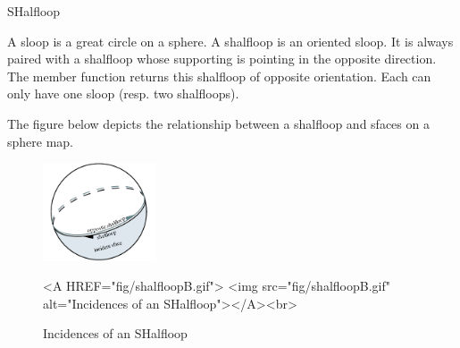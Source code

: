 
\ccRefPageBegin



\begin{ccRefClass}{SHalfloop}

\ccDefinition

A sloop is a great circle on a sphere. A shalfloop is an oriented sloop. It is always paired with a 
shalfloop whose supporting  is pointing in
the opposite direction. The  member function returns
this shalfloop of opposite orientation. Each  can only have one sloop 
(resp. two shalfloops).

The figure below
depicts the relationship between a shalfloop and sfaces on a sphere map.  


\begin{figure}[bht]
\begin{center}
\begin{ccTexOnly}
          \parbox{0.3\textwidth}{%
              \includegraphics[width=0.3\textwidth]{Nef_S2_ref/fig/shalfloopB}%
          }
\end{ccTexOnly}
\begin{ccHtmlOnly}
    <A HREF="fig/shalfloopB.gif">
        <img src="fig/shalfloopB.gif" 
             alt="Incidences of an SHalfloop"></A><br>
\end{ccHtmlOnly}
\caption{Incidences of an SHalfloop}
\label{figureNefS2SHalfloopIncidences}
\end{center}
\end{figure}


\end{ccRefClass}
